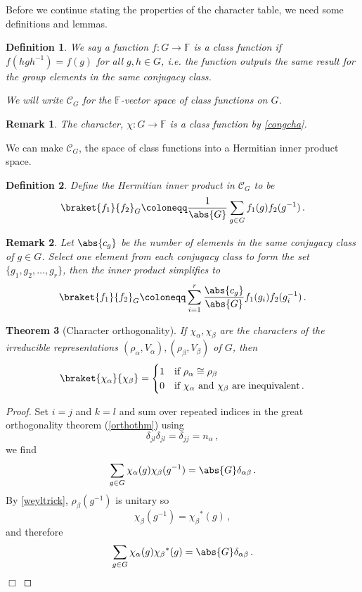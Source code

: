 \documentclass{article}
\theoremstyle{plain}\theoremheaderfont{\normalfont\itshape}\theorembodyfont{\rmfamily}\theoremseparator{.}\newtheorem*{rem}{Remark}\newtheorem*{ex}{Example}\newtheorem*{proof}{Proof}\newtheorem*{altp}{Alternative proof}
\theoremstyle{plain}\theoremheaderfont{\normalfont\bfseries}\theorembodyfont{\rmfamily}\theoremseparator{.}\newtheorem{thm}{Theorem}[section]\newtheorem{lem}[thm]{Lemma}\newtheorem{prop}[thm]{Proposition}\newtheorem*{cor}{Corollary}\newtheorem{defn}[thm]{Definition}\newtheorem{clm}[thm]{Claim}\newtheorem{clminproof}{Claim}
\theoremstyle{break}\theoremheaderfont{\normalfont\itshape}\theorembodyfont{\rmfamily}\theoremseparator{.\medskip}\newtheorem*{proofskip}{Proof}\newtheorem*{exs}{Examples}\newtheorem*{rems}{Remarks}
\theoremstyle{break}\theoremheaderfont{\normalfont\bfseries}\theorembodyfont{\rmfamily}\theoremseparator{.\medskip}\newtheorem{lemskip}[thm]{Lemma}\newtheorem{defnskip}[thm]{Definition}\newtheorem{propskip}[thm]{Proposition}\newtheorem{thmskip}[thm]{Theorem}
\numberwithin{equation}{section}
\newcommand{\qed}{\hfill\ensuremath{\Box}}
\begin{document}
	Before we continue stating the properties of the character table, we need some definitions and lemmas.
	\begin{defn}
		We say a function \(f:G\to\mathbb{F}\) is a \textit{class function} if \(f(hgh^{-1})=f(g)\) for all \(g,h\in G\), i.e. the function outputs the same result for the group elements in the same conjugacy class.
		
		We will write \(\mathcal{C}_G\) for the \(\mathbb{F}\)-vector space of class functions on \(G\).
	\end{defn}
	\begin{rem}
		The character, \(\chi:G\to\mathbb{F}\) is a class function by \cref{congcha}.
	\end{rem}
	We can make \(\mathcal{C}_G\), the space of class functions into a Hermitian inner product space.
	\begin{defn}
		Define the \textit{Hermitian inner product in \(\mathcal{C}_G\)} to be
		\[\braket{f_1}{f_2}_G\coloneqq\frac{1}{\abs{G}}\sum_{g\in G}f_1(g)f_2(g^{-1})\,.\]
	\end{defn}
	\begin{rem}
		Let \(\abs{c_g}\) be the number of elements in the same conjugacy class of \(g\in G\). Select one element from each conjugacy class to form the set \(\{g_1,g_2,\dots,g_r\}\), then the inner product simplifies to
		\[\braket{f_1}{f_2}_G\coloneqq\sum_{i=1}^r\frac{\abs{c_g}}{\abs{G}}f_1(g_i)f_2(g_i^{-1})\,.\]
	\end{rem}
	\begin{thm}[Character orthogonality]\label{charortho}
		If \(\chi_\alpha,\chi_\beta\) are the characters of the irreducible representations \((\rho_\alpha,V_\alpha),(\rho_\beta,V_\beta)\) of \(G\), then
		\[\braket{\chi_\alpha}{\chi_\beta}=\begin{cases}
			1 & \text{if }\rho_\alpha\cong\rho_\beta\\
			0 & \text{if }\chi_\alpha\text{ and }\chi_\beta\text{ are inequivalent}\,.
		\end{cases}\]
	\end{thm}
	\begin{proof}
		Set \(i=j\) and \(k=l\) and sum over repeated indices in the great orthogonality theorem (\cref{orthothm}) using
		\[\delta_{jl}\delta_{jl}=\delta_{jj}=n_\alpha\,,\]
		we find
		\[\sum_{g\in G}\chi_\alpha(g)\chi_\beta(g^{-1})=\abs{G}\delta_{\alpha\beta}\,.\]
		By \cref{weyltrick}, \(\rho_\beta(g^{-1})\) is unitary so
		\[\chi_\beta(g^{-1})={\chi_\beta}^*(g)\,,\]
		and therefore
		\[\sum_{g\in G}\chi_\alpha(g){\chi_\beta}^*(g)=\abs{G}\delta_{\alpha\beta}\,.\]\qed
	\end{proof}
	
\end{document}
